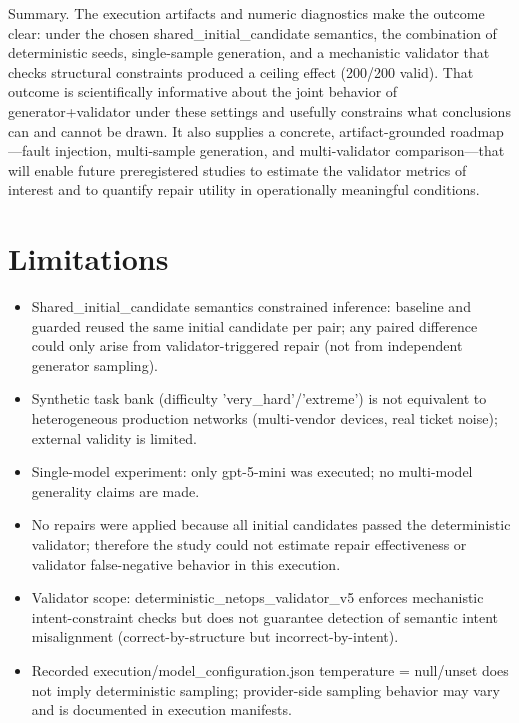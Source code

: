 \documentclass[conference]{IEEEtran}
\begin{document}
Summary. The execution artifacts and numeric diagnostics make the outcome clear: under the chosen shared\_initial\_candidate semantics, the combination of deterministic seeds, single-sample generation, and a mechanistic validator that checks structural constraints produced a ceiling effect (200/200 valid). That outcome is scientifically informative about the joint behavior of generator+validator under these settings and usefully constrains what conclusions can and cannot be drawn. It also supplies a concrete, artifact-grounded roadmap---fault injection, multi-sample generation, and multi-validator comparison---that will enable future preregistered studies to estimate the validator metrics of interest and to quantify repair utility in operationally meaningful conditions.

\section{Limitations}
\begin{itemize}
\item Shared\_initial\_candidate semantics constrained inference: baseline and guarded reused the same initial candidate per pair; any paired difference could only arise from validator-triggered repair (not from independent generator sampling).
\item Synthetic task bank (difficulty 'very\_hard'/'extreme') is not equivalent to heterogeneous production networks (multi-vendor devices, real ticket noise); external validity is limited.
\item Single-model experiment: only gpt-5-mini was executed; no multi-model generality claims are made.
\item No repairs were applied because all initial candidates passed the deterministic validator; therefore the study could not estimate repair effectiveness or validator false-negative behavior in this execution.
\item Validator scope: deterministic\_netops\_validator\_v5 enforces mechanistic intent-constraint checks but does not guarantee detection of semantic intent misalignment (correct-by-structure but incorrect-by-intent).
\item Recorded execution/model\_configuration.json temperature = null/unset does not imply deterministic sampling; provider-side sampling behavior may vary and is documented in execution manifests.
\end{itemize}
\end{document}
